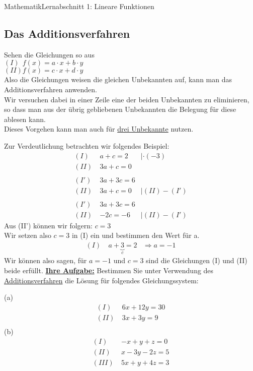 \documentclass[11pt,twocolumn,oneside,openany,headings=optiontotoc,11pt,numbers=noenddot]{article}
\begin{document}
\begin{worksheet}{}{Mathematik}{Lernabschnitt 1: Lineare Funktionen}
		\subsection{Das Additionsverfahren}
		Sehen die Gleichungen so aus\\
		\((I)\ \ f(x) = a\cdot{}x + b\cdot{}y\)\\
		\((II) f(x) = c\cdot{}x + d\cdot{}y\)\\
		Also die Gleichungen weisen die gleichen Unbekannten auf, kann man das Additionsverfahren anwenden.\\
		Wir versuchen dabei in einer Zeile eine der beiden Unbekannten zu eliminieren, so dass man aus der übrig gebliebenen Unbekannten die Belegung für diese ablesen kann.\\
		Dieses Vorgehen kann man auch für \underline{drei Unbekannte} nutzen.\\
		\par\bigskip\noindent
		Zur Verdeutlichung betrachten wir folgendes Beispiel:
		\begin{align*}
			(I)\ & a + c = 2 & |\cdot(-3)\\
			(II)\ & 3a + c = 0 \\
			\\
			(I')\ & 3a + 3c = 6\\
			(II)\ & 3a + c = 0 & |(II)-(I')\\
			\\
			(I')\ & 3a + 3c = 6\\
			(II)\ & -2c = -6 & |(II)-(I')
		\end{align*}
		Aus (II') können wir folgern: \(c = 3\)\\
		Wir setzen also \(c=3\) in (I) ein und bestimmen den Wert für a.
		\begin{align*}
			(I)\ & a + \underbrace{3}_{c} = 2 & \Rightarrow a = -1
		\end{align*}
		Wir können also sagen, für \(a = -1\) und \(c = 3\) sind die Gleichungen (I) und (II) beide erfüllt.
		\newpage
		\noindent
		\textbf{\underline{Ihre Aufgabe:}} Bestimmen Sie unter Verwendung des \underline{Additionsverfahren} die Lösung für folgendes Gleichungssystem:\\
		\par\noindent
		(a)
		\begin{align*}
			(I)\ & 6x + 12y = 30\\
			(II)\ & 3x + 3y = 9\\
		\end{align*}
		\vfill
		(b)
		\begin{align*}
			(I)\ & -x + y + z = 0\\
			(II)\ & x - 3y -2z = 5\\
			(III)\ & 5x + y + 4z = 3
		\end{align*}
		\vfill
	\end{worksheet}
\end{document}
